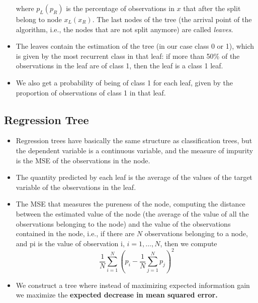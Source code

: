 \begin{itemize}
          where $p_{L}( p_{R})$ is the percentage of observations in $x$ that after the split belong to node $x_{L}( x_{R})$. The last nodes of the tree (the arrival point of the algorithm, i.e., the nodes that are not split anymore) are called \textit{leaves}. 
    \item The leaves contain the estimation of the tree (in our case class 0 or 1), which is given by the most recurrent class in that leaf: if more than 50\% of the observations in the leaf are of class 1, then the leaf is a class 1 leaf.
    \item We also get a probability of being of class 1 for each leaf, given by the proportion of observations of class 1 in that leaf.
\end{itemize}
\subsection{Regression Tree}
\begin{itemize}
    \item Regression trees have basically the same structure as classification trees, but the dependent variable is a continuous variable, and the measure of impurity is the MSE of the observations in the node. 
    \item The quantity predicted by each leaf is the average of the values of the target variable of the observations in the leaf.
    \item The MSE that measures the pureness of the node, computing the distance between the estimated value of the node (the average of the value of all the observations belonging to the node) and the value of the observations contained in the node, i.e., if there are $N$ observations belonging to a node, and pi is the value of observation i, $i=1,\dotsc ,N$, then we compute
          \begin{equation*}
              \frac{1}{N}\sum\limits _{i=1}^{N}\left( p_{i} -\frac{1}{N}\sum\limits _{j=1}^{N} p_{j}\right)^{2}
          \end{equation*}
    \item We construct a tree where instead of maximizing expected information gain we maximize the \textbf{expected decrease in mean squared error.}
\end{itemize}
